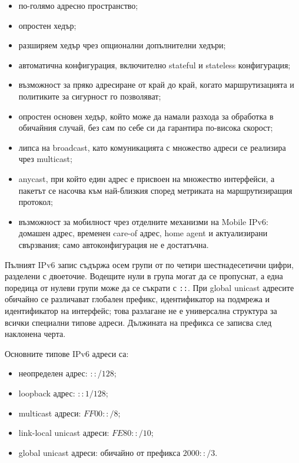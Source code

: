 \begin{itemize}
    \item по-голямо адресно пространство;
    \item опростен хедър;
    \item разширяем хедър чрез опционални допълнителни хедъри;
    \item автоматична конфигурация, включително stateful и stateless конфигурация;
    \item възможност за пряко адресиране от край до край, когато маршрутизацията и политиките за сигурност го позволяват;
    \item опростен основен хедър, който може да намали разхода за обработка в обичайния случай, без сам по себе си да гарантира по-висока скорост;
    \item липса на broadcast, като комуникацията с множество адреси се реализира чрез multicast;
    \item anycast, при който един адрес е присвоен на множество интерфейси, а пакетът се насочва към най-близкия според метриката на маршрутизиращия протокол;
    \item възможност за мобилност чрез отделните механизми на Mobile IPv6: домашен адрес, временен care-of адрес, home agent и актуализирани свързвания; само автоконфигурация не е достатъчна.
\end{itemize}

Пълният IPv6 запис съдържа осем групи от по четири шестнадесетични цифри, разделени с двоеточие. Водещите нули в група могат да се пропуснат, а една поредица от нулеви групи може да се съкрати с \texttt{::}. При global unicast адресите обичайно се различават глобален префикс, идентификатор на подмрежа и идентификатор на интерфейс; това разлагане не е универсална структура за всички специални типове адреси. Дължината на префикса се записва след наклонена черта.

Основните типове IPv6 адреси са:

\begin{itemize}
    \item неопределен адрес: $::$/$128$;
    \item loopback адрес: $::1/128$;
    \item multicast адреси: $FF00::/8$;
    \item link-local unicast адреси: $FE80::/10$;
    \item global unicast адреси: обичайно от префикса $2000::/3$.
\end{itemize}

